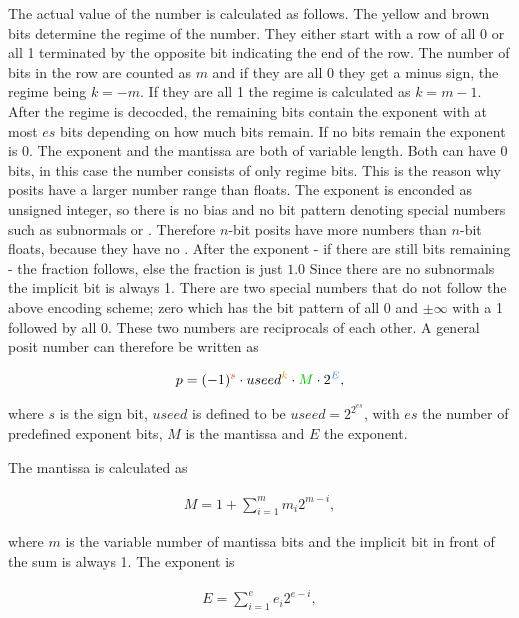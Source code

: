 \documentclass{article}
\theoremstyle{plain} %
\theoremstyle{remark} %
\numberwithin{equation}{section}
\begin{document}
The actual value of the number is calculated as follows. The yellow and brown bits determine the regime of the number. They either start with a \textcolor{cyellow}{row of all \num{0} or all \num{1}} terminated by the \textcolor{cbrown}{opposite bit} indicating the end of the row. The number of bits in the row are counted as $m$ and if they are all \num{0} they get a minus sign, the regime being $k=-m$. If they are all \num{1} the regime is calculated as $k=m-1$. After the regime is decocded, the remaining bits contain the exponent with at most $es$ bits depending on how much bits remain. If no bits remain the exponent is \num{0}. The exponent and the mantissa are both of variable length. Both can have \num{0} bits, in this case the number consists of only regime bits. This is the reason why posits have a larger number range than floats. The exponent is enconded as unsigned integer, so there is no bias and no bit pattern denoting special numbers such as subnormals or . Therefore $n$-bit posits have more numbers than $n$-bit floats, because they have no . After the exponent - if there are still bits remaining - the fraction follows, else the fraction is just $1.0$ Since there are no subnormals the implicit bit is always \num{1}. There are two special numbers that do not follow the above encoding scheme; zero which has the bit pattern of all \num{0} and $\pm \infty$ with a \num{1} followed by all \num{0}. These two numbers are reciprocals of each other. A general posit number can therefore be written as

\begin{align*}
    p = (-1)^{\textcolor{corange}{s}} \cdot useed^{\textcolor{cyellow}{k}} \cdot \textcolor{cgreen}{M} \cdot 2^{\textcolor{cblue}{E}},
\end{align*}

where $s$ is the sign bit, $useed$ is defined to be $useed = 2^{2^{es}}$, with $es$ the number of predefined exponent bits, $M$ is the mantissa and $E$ the exponent.

The mantissa is calculated as

\begin{align*}
    M = 1 + \sum_{i=1}^{m} m_{i} 2^{m-i},
\end{align*}

where $m$ is the variable number of mantissa bits and the implicit bit in front of the sum is always \num{1}. The exponent is

\begin{align*}
    E = \sum_{i=1}^{e} e_{i} 2^{e-i},
\end{align*}
\end{document}
